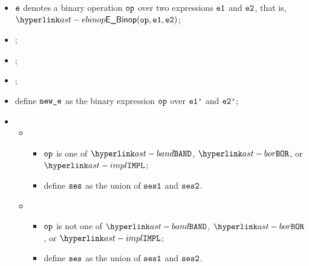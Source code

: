 \ProseParagraph
\AllApply
\begin{itemize}
  \item $\ve$ denotes a binary operation $\op$ over two expressions $\veone$ and $\vetwo$, that is, \\ $\EBinop(\op, \veone, \vetwo)$;
  \item \Proseannotateexpr{$\tenv$}{$\veone$}{\\ $(\vtone, \veonep, \vsesone)$\ProseOrTypeError};
  \item \Proseannotateexpr{$\tenv$}{$\vetwo$}{\\ $(\vttwo, \vetwop, \vsestwo)$\ProseOrTypeError};
  \item \Proseapplybinoptypes{$\tenv$}{\op}{\vtone}{\vttwo}{$\vt$\ProseOrTypeError};
  \item define $\newe$ as the binary expression $\op$ over $\veonep$ and $\vetwop$;
  \item \OneApplies
  \begin{itemize}
    \item {}
    \begin{itemize}
      \item $\op$ is one of $\BAND$, $\BOR$, or $\IMPL$;
      \item define $\vses$ as the union of $\vsesone$ and $\vsestwo$.
    \end{itemize}

    \item {}
    \begin{itemize}
      \item $\op$ is not one of $\BAND$, $\BOR$, or $\IMPL$;
      \item define $\vses$ as the union of $\vsesone$ and $\vsestwo$.
    \end{itemize}
  \end{itemize}
\end{itemize}
\FormallyParagraph
\begin{mathpar}
\end{mathpar}

